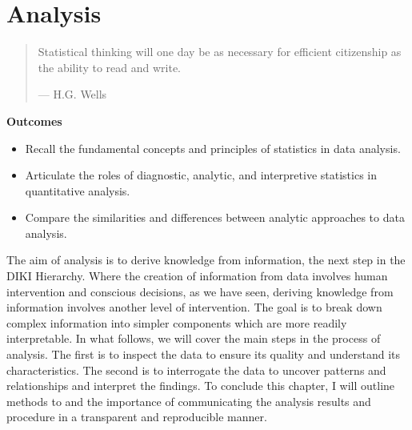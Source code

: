 \documentclass[
  letterpaper,
]{latex/krantz}
\providecommand{\tightlist}{%
  \setlength{\itemsep}{0pt}\setlength{\parskip}{0pt}}\usepackage{longtable,booktabs,array}
\theoremstyle{definition}
\theoremstyle{remark}
\begin{document}
\chapter{Analysis}\label{sec-analysis-chapter}

\begin{quote}
Statistical thinking will one day be as necessary for efficient
citizenship as the ability to read and write.

--- H.G. Wells
\end{quote}

\begin{tcolorbox}[enhanced jigsaw, toprule=.15mm, breakable, colback=white, opacityback=0, leftrule=.75mm, bottomrule=.15mm, colframe=quarto-callout-color-frame, left=2mm, arc=.35mm, rightrule=.15mm]

\textbf{ Outcomes}

\begin{itemize}
\tightlist
\item
  Recall the fundamental concepts and principles of statistics in data
  analysis.
\item
  Articulate the roles of diagnostic, analytic, and interpretive
  statistics in quantitative analysis.
\item
  Compare the similarities and differences between analytic approaches
  to data analysis.
\end{itemize}

\end{tcolorbox}

The aim of analysis is to derive knowledge from information, the next
step in the DIKI Hierarchy. Where the creation of information from data
involves human intervention and conscious decisions, as we have seen,
deriving knowledge from information involves another level of
intervention. The goal is to break down complex information into simpler
components which are more readily interpretable. In what follows, we
will cover the main steps in the process of analysis. The first is to
inspect the data to ensure its quality and understand its
characteristics. The second is to interrogate the data to uncover
patterns and relationships and interpret the findings. To conclude this
chapter, I will outline methods to and the importance of communicating
the analysis results and procedure in a transparent and reproducible
manner.
\end{document}
